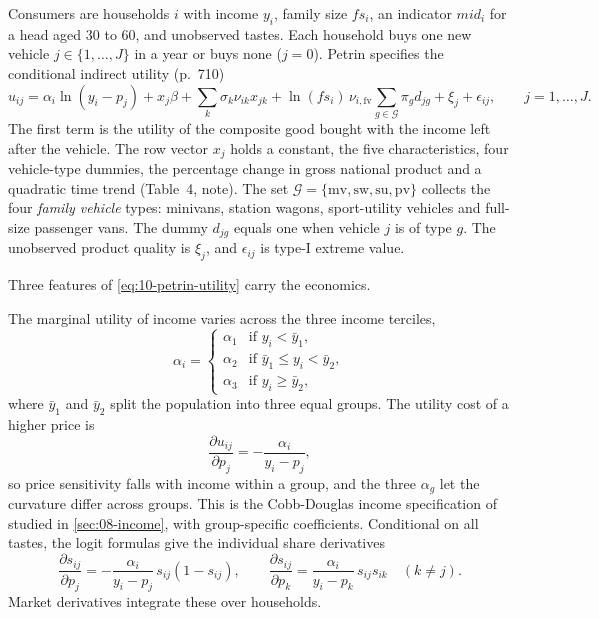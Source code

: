 Consumers are households $i$ with income $y_i$, family size $fs_i$, an indicator $\mathit{mid}_i$ for a head aged 30 to
60, and unobserved tastes. Each household buys one new vehicle $j \in \{1, \dots, J\}$ in a year or buys none ($j = 0$).
Petrin specifies the conditional indirect utility (p.~710)
\begin{equation}\label{eq:10-petrin-utility}
  u_{ij} = \alpha_i \ln(y_i - p_j) + x_j\beta + \sum_{k} \sigma_k \nu_{ik} x_{jk}
           + \ln(fs_i)\,\nu_{i,\mathrm{fv}} \sum_{g \in \mathcal{G}} \pi_g d_{jg} + \xi_j + \epsilon_{ij},
  \qquad j = 1, \dots, J .
\end{equation}
The first term is the utility of the composite good bought with the income left after the vehicle. The row vector
$x_j$ holds a constant, the five characteristics, four vehicle-type dummies, the percentage change in gross national
product and a quadratic time trend (Table~4, note). The set $\mathcal{G} = \{\mathrm{mv}, \mathrm{sw}, \mathrm{su},
\mathrm{pv}\}$ collects the four \emph{family vehicle} types: minivans, station wagons, sport-utility vehicles and
full-size passenger vans. The dummy $d_{jg}$ equals one when vehicle $j$ is of type $g$. The unobserved product quality
is $\xi_j$, and $\epsilon_{ij}$ is type-I extreme value.

Three features of \eqref{eq:10-petrin-utility} carry the economics.

 The marginal utility of income varies across the three income terciles,
\begin{equation*}
  \alpha_i = \begin{cases}
    \alpha_1 & \text{if } y_i < \bar y_1, \\
    \alpha_2 & \text{if } \bar y_1 \le y_i < \bar y_2, \\
    \alpha_3 & \text{if } y_i \ge \bar y_2,
  \end{cases}
\end{equation*}
where $\bar y_1$ and $\bar y_2$ split the population into three equal groups. The utility cost of a higher price is
\begin{equation}\label{eq:10-petrin-dudp}
  \frac{\partial u_{ij}}{\partial p_j} = -\frac{\alpha_i}{y_i - p_j} ,
\end{equation}
so price sensitivity falls with income within a group, and the three $\alpha_g$ let the curvature differ across groups.
This is the Cobb-Douglas income specification of \citet{BerryLevinsohnPakes1995} studied in \cref{sec:08-income}, with
group-specific coefficients. Conditional on all tastes, the logit formulas give the individual share derivatives
\begin{equation*}
  \frac{\partial s_{ij}}{\partial p_j} = -\frac{\alpha_i}{y_i - p_j}\,s_{ij}(1 - s_{ij}), \qquad
  \frac{\partial s_{ij}}{\partial p_k} = \frac{\alpha_i}{y_i - p_k}\,s_{ij}s_{ik} \quad (k \ne j).
\end{equation*}
Market derivatives integrate these over households.

